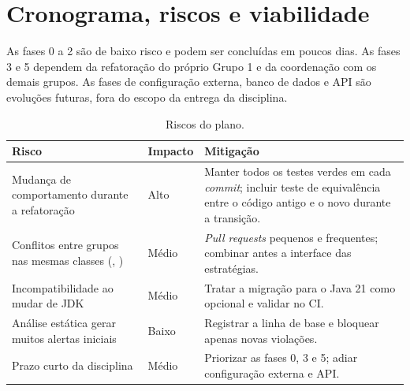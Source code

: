 \section{Cronograma, riscos e viabilidade}
As fases 0 a 2 s\~ao de baixo risco e podem ser conclu\'idas em poucos dias. As fases 3 e 5 dependem da refatora\c{c}\~ao do pr\'oprio Grupo 1 e da coordena\c{c}\~ao com os demais grupos. As fases de configura\c{c}\~ao externa, banco de dados e API s\~ao evolu\c{c}\~oes futuras, fora do escopo da entrega da disciplina.

\begin{table}[H]\centering\small
\begin{tabularx}{\textwidth}{>{\raggedright\arraybackslash}p{4.4cm}>{\raggedright\arraybackslash}p{2cm}Y}
\toprule \textbf{Risco} & \textbf{Impacto} & \textbf{Mitiga\c{c}\~ao} \\ \midrule
Mudan\c{c}a de comportamento durante a refatora\c{c}\~ao & Alto & Manter todos os testes verdes em cada \textit{commit}; incluir teste de equival\^encia entre o c\'odigo antigo e o novo durante a transi\c{c}\~ao. \\
Conflitos entre grupos nas mesmas classes (, ) & M\'edio & \textit{Pull requests} pequenos e frequentes; combinar antes a interface das estrat\'egias. \\
Incompatibilidade ao mudar de JDK & M\'edio & Tratar a migra\c{c}\~ao para o Java 21 como opcional e validar no CI. \\
An\'alise est\'atica gerar muitos alertas iniciais & Baixo & Registrar a linha de base e bloquear apenas novas viola\c{c}\~oes. \\
Prazo curto da disciplina & M\'edio & Priorizar as fases 0, 3 e 5; adiar configura\c{c}\~ao externa e API. \\
\bottomrule\end{tabularx}
\caption{Riscos do plano.}\end{table}

